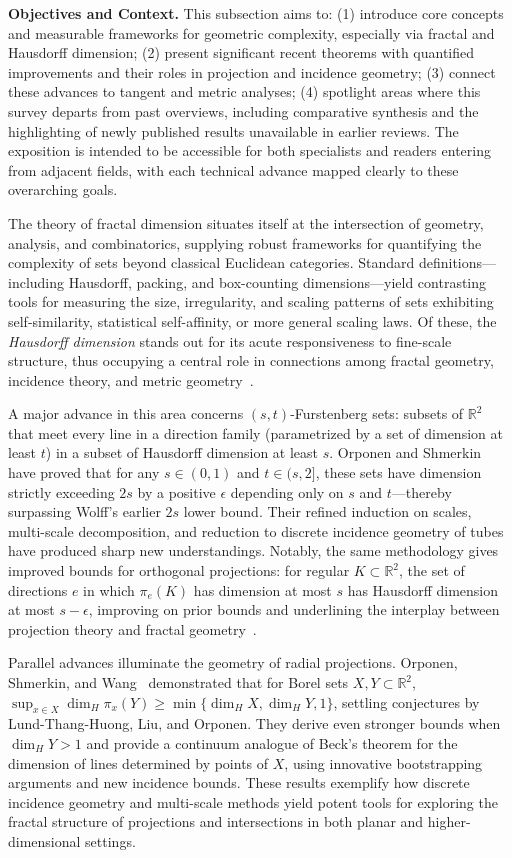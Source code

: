 \documentclass[sigconf]{acmart}
\begin{document}
\textbf{Objectives and Context.} This subsection aims to: (1) introduce core concepts and measurable frameworks for geometric complexity, especially via fractal and Hausdorff dimension; (2) present significant recent theorems with quantified improvements and their roles in projection and incidence geometry; (3) connect these advances to tangent and metric analyses; (4) spotlight areas where this survey departs from past overviews, including comparative synthesis and the highlighting of newly published results unavailable in earlier reviews. The exposition is intended to be accessible for both specialists and readers entering from adjacent fields, with each technical advance mapped clearly to these overarching goals.

The theory of fractal dimension situates itself at the intersection of geometry, analysis, and combinatorics, supplying robust frameworks for quantifying the complexity of sets beyond classical Euclidean categories. Standard definitions—including Hausdorff, packing, and box-counting dimensions—yield contrasting tools for measuring the size, irregularity, and scaling patterns of sets exhibiting self-similarity, statistical self-affinity, or more general scaling laws. Of these, the \emph{Hausdorff dimension} stands out for its acute responsiveness to fine-scale structure, thus occupying a central role in connections among fractal geometry, incidence theory, and metric geometry~\cite{ref68}.

A major advance in this area concerns $(s, t)$-Furstenberg sets: subsets of $\mathbb{R}^2$ that meet every line in a direction family (parametrized by a set of dimension at least $t$) in a subset of Hausdorff dimension at least $s$. Orponen and Shmerkin~\cite{ref68} have proved that for any $s \in (0,1)$ and $t\in(s,2]$, these sets have dimension strictly exceeding $2s$ by a positive $\epsilon$ depending only on $s$ and $t$—thereby surpassing Wolff's earlier $2s$ lower bound. Their refined induction on scales, multi-scale decomposition, and reduction to discrete incidence geometry of tubes have produced sharp new understandings. Notably, the same methodology gives improved bounds for orthogonal projections: for regular $K \subset \mathbb{R}^2$, the set of directions $e$ in which $\pi_e(K)$ has dimension at most $s$ has Hausdorff dimension at most $s - \epsilon$, improving on prior bounds and underlining the interplay between projection theory and fractal geometry~\cite{ref68}.

Parallel advances illuminate the geometry of radial projections. Orponen, Shmerkin, and Wang~\cite{ref92} demonstrated that for Borel sets $X, Y \subset \mathbb{R}^2$, $\sup_{x \in X} \dim_H \pi_x(Y) \geq \min\{ \dim_H X, \dim_H Y, 1 \}$, settling conjectures by Lund-Thang-Huong, Liu, and Orponen. They derive even stronger bounds when $\dim_H Y > 1$ and provide a continuum analogue of Beck's theorem for the dimension of lines determined by points of $X$, using innovative bootstrapping arguments and new incidence bounds. These results exemplify how discrete incidence geometry and multi-scale methods yield potent tools for exploring the fractal structure of projections and intersections in both planar and higher-dimensional settings.
\end{document}
